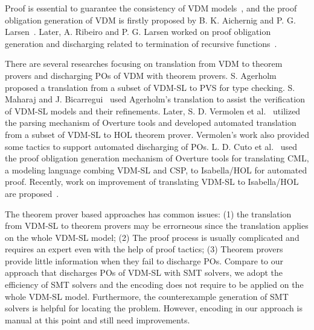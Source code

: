 Proof is essential to guarantee the consistency of VDM models~\cite{978-3-540-19813-0}, and the proof obligation generation of VDM is firstly proposed by B. K. Aichernig and P. G. Larsen~\cite{AL:97:POGV}. Later, A. Ribeiro and P. G. Larsen worked on proof obligation generation and discharging related to termination of recursive functions~\cite{Ribeiro2010}.

There are several researches focusing on translation from VDM to theorem provers and discharging POs of VDM with theorem provers. S. Agerholm~\cite{Agerholm1996} proposed a translation from a subset of VDM-SL to PVS for type checking. S. Maharaj and J. Bicarregui~\cite{632849} used Agerholm's translation to assist the verification of VDM-SL models and their refinements. Later, S. D. Vermolen et al.~\cite{Verm:2007:master,Vermolen:2010:PCV:1774088.1774608} utilized the parsing mechanism of Overture tools and developed automated translation from a subset of VDM-SL to HOL theorem prover. Vermolen's work also provided some tactics to support automated discharging of POs. L. D. Cuto et al.~\cite{CFP:14:TVCSAP} used the proof obligation generation mechanism of Overture tools for translating CML, a modeling language combing VDM-SL and CSP, to Isabella/HOL for automated proof. Recently, work on improvement of translating VDM-SL to Isabella/HOL are proposed~\cite{CT:15:EOCGTIS}.

The theorem prover based approaches has common issues: (1) the translation from VDM-SL to theorem provers may be errorneous since the translation applies on the whole VDM-SL model; (2) The proof process is usually complicated and requires an expert even with the help of proof tactics; (3) Theorem provers provide little information when they fail to discharge POs. Compare to our approach that discharges POs of VDM-SL with SMT solvers, we adopt the efficiency of SMT solvers and the encoding does not require to be applied on the whole VDM-SL model. Furthermore, the counterexample generation of SMT solvers is helpful for locating the problem. However, encoding in our approach is manual at this point and still need improvements.

